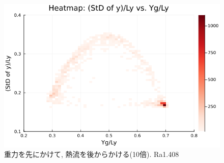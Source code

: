 \begin{figure}[H]
  \centering
  \includegraphics[scale=0.6]{image/qrs10_drop_heat/2023-12-28T10:59:29.846_qrs_gap_chi1.265_Ay50_rho0.4_T0.43_dT0.04_Rd0.0_Rt0.375_Ra1.4081535_g0.0003999718779659611_run4.0e8.png}
  \caption{重力を先にかけて, 熱流を後からかける(10倍). Ra1.408}
  \label{}
\end{figure} 
